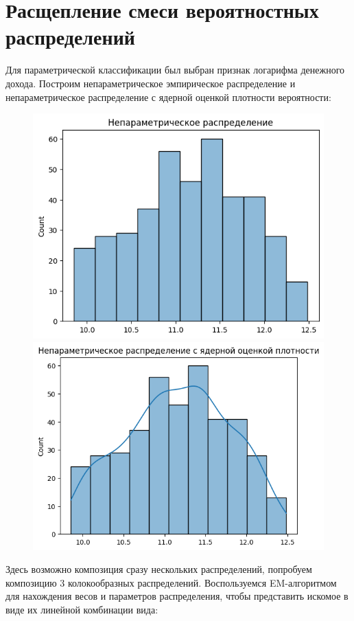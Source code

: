 \documentclass[12pt]{report}
\begin{document}
\section{Расщепление смеси вероятностных распределений}
Для параметрической классификации был выбран признак логарифма денежного дохода. Построим непараметрическое эмпирическое распределение и непараметрическое распределение с ядерной оценкой плотности вероятности:
\begin{figure}[H]
  \centering
  \includegraphics[scale=0.5]{./imgs/hist.png} \hspace*{0.5cm} \includegraphics[scale=0.5]{./imgs/hist_kde.png}
\end{figure}
Здесь возможно композиция сразу нескольких распределений, попробуем композицию 3 колокообразных распределений. Воспользуемся EM-алгоритмом для нахождения весов и параметров распределения, чтобы представить искомое в виде их линейной комбинации вида: 
\end{document}
